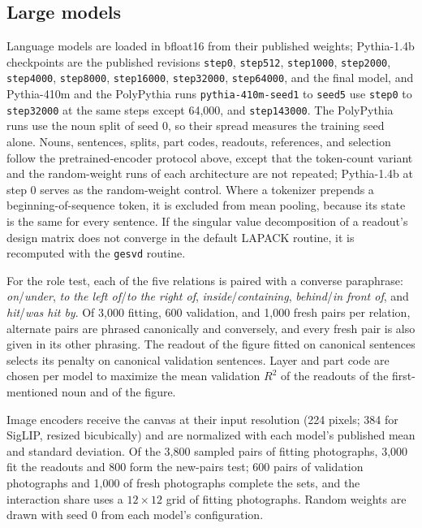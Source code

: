 \documentclass[10pt]{article}
\theoremstyle{plain}
\theoremstyle{remark}
\begin{document}
\subsection{Large models}
Language models are loaded in bfloat16 from their published weights; Pythia-1.4b checkpoints are the published revisions \texttt{step0}, \texttt{step512}, \texttt{step1000}, \texttt{step2000}, \texttt{step4000}, \texttt{step8000}, \texttt{step16000}, \texttt{step32000}, \texttt{step64000}, and the final model, and Pythia-410m and the PolyPythia runs \texttt{pythia-410m-seed1} to \texttt{seed5} use \texttt{step0} to \texttt{step32000} at the same steps except 64{,}000, and \texttt{step143000}. The PolyPythia runs use the noun split of seed 0, so their spread measures the training seed alone. Nouns, sentences, splits, part codes, readouts, references, and selection follow the pretrained-encoder protocol above, except that the token-count variant and the random-weight runs of each architecture are not repeated; Pythia-1.4b at step 0 serves as the random-weight control. Where a tokenizer prepends a beginning-of-sequence token, it is excluded from mean pooling, because its state is the same for every sentence. If the singular value decomposition of a readout's design matrix does not converge in the default LAPACK routine, it is recomputed with the \texttt{gesvd} routine.

For the role test, each of the five relations is paired with a converse paraphrase: \emph{on}/\emph{under}, \emph{to the left of}/\emph{to the right of}, \emph{inside}/\emph{containing}, \emph{behind}/\emph{in front of}, and \emph{hit}/\emph{was hit by}. Of 3{,}000 fitting, 600 validation, and 1{,}000 fresh pairs per relation, alternate pairs are phrased canonically and conversely, and every fresh pair is also given in its other phrasing. The readout of the figure fitted on canonical sentences selects its penalty on canonical validation sentences. Layer and part code are chosen per model to maximize the mean validation $R^2$ of the readouts of the first-mentioned noun and of the figure.

Image encoders receive the canvas at their input resolution (224 pixels; 384 for SigLIP, resized bicubically) and are normalized with each model's published mean and standard deviation. Of the 3{,}800 sampled pairs of fitting photographs, 3{,}000 fit the readouts and 800 form the new-pairs test; 600 pairs of validation photographs and 1{,}000 of fresh photographs complete the sets, and the interaction share uses a $12 \times 12$ grid of fitting photographs. Random weights are drawn with seed 0 from each model's configuration.
\end{document}

